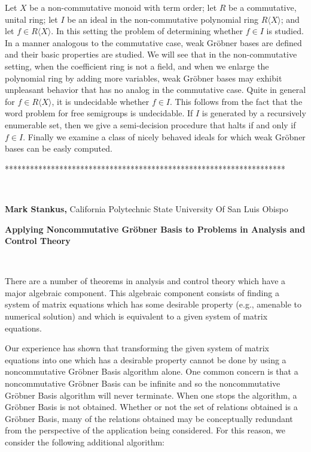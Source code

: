 \documentclass[12pt]{article}
\begin{document}
\noindent  Let $X$ be a non-commutative monoid with term order; let $R$ be a
commutative, unital ring; let $I$ be an ideal in the non-commutative
polynomial ring $R\langle X\rangle $; and let $f\in R\langle X\rangle $. In
this setting the problem of determining whether $f\in I$ is studied. In a
manner analogous to the commutative case, weak Gr\"{o}bner bases are defined
and their basic properties are studied. We will see that in the
non-commutative setting, when the coefficient ring is not a field, and when
we enlarge the polynomial ring by adding more variables, weak Gr\"{o}bner
bases may exhibit unpleasant behavior that has no analog in the commutative
case. Quite in general for $f\in R\langle X\rangle $, it is undecidable
whether $f\in I$. This follows from the fact that the word problem for free
semigroups is undecidable. If $I$ is generated by a recursively enumerable
set, then we give a semi-decision procedure that halts if and only if $f\in
I $. Finally we examine a class of nicely behaved ideals for which weak
Gr\"{o}bner bases can be easly computed.

\begin{center}
*******************************************************************
\end{center}

\vspace{.1in}\ 

\noindent \textbf{Mark Stankus, }California Polytechnic State University Of
San Luis Obispo

\noindent \textbf{Applying Noncommutative Gr\"{o}bner Basis to Problems in
Analysis and Control Theory}

\smallskip\ 

\noindent  There are a number of theorems in analysis and control theory
which have a major algebraic component. This algebraic component consists of
finding a system of matrix equations which has some desirable property
(e.g., amenable to numerical solution) and which is equivalent to a given
system of matrix equations.

Our experience has shown that transforming the given system of matrix
equations into one which has a desirable property cannot be done by using a
noncommutative Gr\"{o}bner Basis algorithm alone. One common concern is that
a noncommutative Gr\"{o}bner Basis can be infinite and so the noncommutative
Gr\"{o}bner Basis algorithm will never terminate. When one stops the
algorithm, a Gr\"{o}bner Basis is not obtained. Whether or not the set of
relations obtained is a Gr\"{o}bner Basis, many of the relations obtained
may be conceptually redundant from the perspective of the application being
considered. For this reason, we consider the following additional algorithm:
\end{document}
